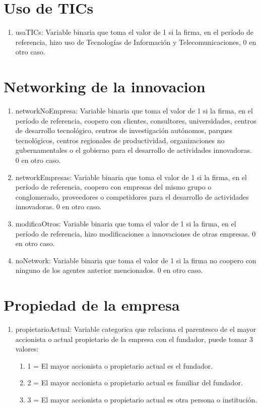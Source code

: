 \documentclass[12pt,a4paper]{article}
\begin{document}
\section{Uso de TICs}

\begin{enumerate}
	\item usaTICs: Variable binaria que toma el valor de 1 si la firma, en el período de referencia, hizo uso de Tecnologías de Información y Telecomunicaciones, 0 en otro caso.
\end{enumerate}

\section{Networking de la innovacion}

\begin{enumerate}
	\item networkNoEmpresa: Variable binaria que toma el valor de 1 si la firma, en el período de referencia, coopero con clientes, consultores, universidades, centros de desarrollo tecnológico, centros de investigación autónomos, parques tecnológicos, centros regionales de productividad, organizaciones no gubernamentales o el gobierno para el desarrollo de actividades innovadoras. 0 en otro caso.
	\item networkEmpresas: Variable binaria que toma el valor de 1 si la firma, en el período de referencia, coopero con empresas del mismo grupo o conglomerado, proveedores o competidores para el desarrollo de actividades innovadoras. 0 en otro caso.
	\item modificaOtros: Variable binaria que toma el valor de 1 si la firma, en el período de referencia, hizo modificaciones a innovaciones de otras empresas. 0 en otro caso.
	\item noNetwork:  Variable binaria que toma el valor de 1 si la firma no coopero con ninguno de los agentes anterior mencionados. 0 en otro caso.
\end{enumerate}

\section{Propiedad de la empresa}

\begin{enumerate}
	\item propietarioActual: Variable categorica que relaciona el parentesco de el mayor accionista o actual propietario de la empresa con el fundador, puede tomar 3 valores:
		 \begin{enumerate}
		 	\item 1 = El mayor accionista o propietario actual es el fundador.
		 	\item 2 = El mayor accionista o propietario actual es familiar del fundador.
		 	\item 3 = El mayor accionista o propietario actual es otra persona o institución.
		 \end{enumerate}
\end{enumerate}
\end{document}
